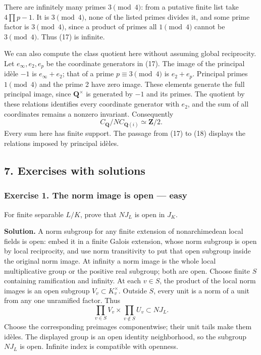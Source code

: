 \documentclass[11pt,a4paper]{article}
\begin{document}
There are infinitely many primes \(3\pmod4\): from a putative finite
list take \(4\prod p-1\). It is \(3\pmod4\), none of the listed primes
divides it, and some prime factor is \(3\pmod4\), since a product of
primes all \(1\pmod4\) cannot be \(3\pmod4\). Thus (17) is infinite.

We can also compute the class quotient here without assuming global
reciprocity. Let \(e_\infty,e_2,e_p\) be the coordinate generators in
(17). The image of the principal idèle \(-1\) is \(e_\infty+e_2\); that
of a prime \(p\equiv3\pmod4\) is \(e_2+e_p\). Principal primes
\(1\pmod4\) and the prime 2 have zero image. These elements generate the
full principal image, since \(\mathbf Q^\times\) is generated by \(-1\)
and its primes. The quotient by these relations identifies every
coordinate generator with \(e_2\), and the sum of all coordinates
remains a nonzero invariant. Consequently \[
C_{\mathbf Q}/N C_{\mathbf Q(i)}\simeq\mathbf Z/2.
\tag{18}
\] Every sum here has finite support. The passage from (17) to (18)
displays the relations imposed by principal idèles.

\subsection{7. Exercises with solutions}\label{exercises-with-solutions}

\subsubsection{Exercise 1. The norm image is open ---
easy}\label{exercise-1.-the-norm-image-is-open-easy}

For finite separable \(L/K\), prove that \(N J_L\) is open in \(J_K\).

\textbf{Solution.} A norm subgroup for any finite extension of
nonarchimedean local fields is open: embed it in a finite Galois
extension, whose norm subgroup is open by local reciprocity, and use
norm transitivity to put that open subgroup inside the original norm
image. At infinity a norm image is the whole local multiplicative group
or the positive real subgroup; both are open. Choose finite \(S\)
containing ramification and infinity. At each \(v\in S\), the product of
the local norm images is an open subgroup \(V_v\subset K_v^\times\).
Outside \(S\), every unit is a norm of a unit from any one unramified
factor. Thus \[
\prod_{v\in S}V_v\times\prod_{v\notin S}U_v
\subset N J_L.
\] Choose the corresponding preimages componentwise; their unit tails
make them idèles. The displayed group is an open identity neighborhood,
so the subgroup \(N J_L\) is open. Infinite index is compatible with
openness.
\end{document}

